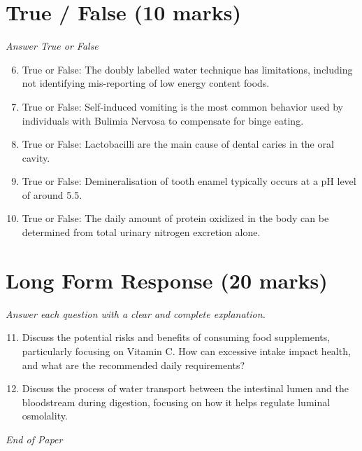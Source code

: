 \documentclass[12pt]{article}
\begin{document}
\section*{True / False (10 marks)}
\textit{Answer True or False}
\begin{enumerate}[label=\arabic*.]
\setcounter{enumi}{5}
\item True or False: The doubly labelled water technique has limitations, including not identifying mis-reporting of low energy content foods.
\item True or False: Self-induced vomiting is the most common behavior used by individuals with Bulimia Nervosa to compensate for binge eating.
\item True or False: Lactobacilli are the main cause of dental caries in the oral cavity.
\item True or False: Demineralisation of tooth enamel typically occurs at a pH level of around 5.5.
\item True or False: The daily amount of protein oxidized in the body can be determined from total urinary nitrogen excretion alone.
\end{enumerate}

\section*{Long Form Response (20 marks)}
\textit{Answer each question with a clear and complete explanation.}
\begin{enumerate}[label=\arabic*.]
\setcounter{enumi}{10}
\item Discuss the potential risks and benefits of consuming food supplements, particularly focusing on Vitamin C. How can excessive intake impact health, and what are the recommended daily requirements?
\item Discuss the process of water transport between the intestinal lumen and the bloodstream during digestion, focusing on how it helps regulate luminal osmolality.
\end{enumerate}

\vfill
\noindent\textit{End of Paper}
\end{document}
